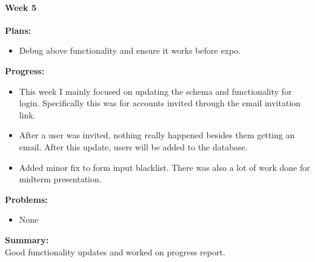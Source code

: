 \paragraph{Week 5}
\begin{adjustwidth}{2.5em}{0pt}
    \vspace{-0.5cm}\textbf{Plans:}
    \vspace{-0.5cm}
    \begin{itemize}
        \item Debug above functionality and ensure it works before expo.
    \end{itemize} 
    \vspace{-0.3cm}\textbf{Progress:}
    \vspace{-0.5cm}
    \begin{itemize}
        \item This week I mainly focused on updating the schema and functionality for login. Specifically this was for accounts invited through the email invitation link. 
		\item After a user was invited, nothing really happened besides them getting an email. After this update, users will be added to the database. 
		\item Added minor fix to form input blacklist. There was also a lot of work done for midterm presentation.  

    \end{itemize} 
    \vspace{-0.3cm}\textbf{Problems:}
    \vspace{-0.5cm}
    \begin{itemize}
        \item None
    \end{itemize}  
    \vspace{-0.3cm}\noindent\textbf{Summary:}\\
    \noindent 
	Good functionality updates and worked on progress report.
\end{adjustwidth} 
